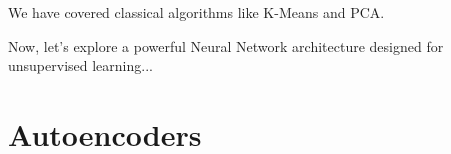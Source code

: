 \begin{frame}[c]
\centering

We have covered classical algorithms like K-Means and PCA.

Now, let's explore a powerful Neural Network architecture designed for unsupervised learning...


\end{frame}


\section{Autoencoders}


